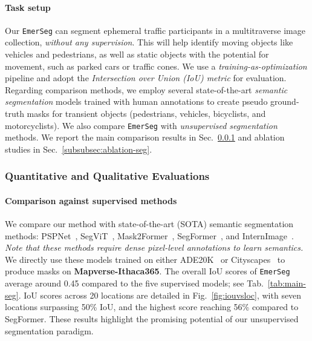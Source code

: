 \paragraph{Task setup} Our \texttt{EmerSeg} can segment ephemeral traffic participants in a multitraverse image collection, \textit{without any supervision}. This will help identify moving objects like vehicles and pedestrians, as well as static objects with the potential for movement, such as parked cars or traffic cones. We use a \textit{training-as-optimization} pipeline and adopt the \textit{Intersection over Union (IoU) metric} for evaluation. Regarding comparison methods, we employ several state-of-the-art \textit{semantic segmentation} models trained with human annotations to create pseudo ground-truth masks for transient objects  (pedestrians, vehicles, bicyclists, and motorcyclists). We also compare \texttt{EmerSeg} with \textit{unsupervised segmentation} methods. We report the main comparison results in Sec.~\ref{subsubsec:main-seg} and ablation studies in Sec.~\ref{subsubsec:ablation-seg}.
\subsubsection{Quantitative and Qualitative Evaluations}
\label{subsubsec:main-seg}
\paragraph{Comparison against supervised methods} We compare our method with state-of-the-art (SOTA) semantic segmentation methods: PSPNet~\cite{zhao2017pyramid}, SegViT~\cite{zhang2022segvit}, 
Mask2Former~\cite{cheng2022masked}, SegFormer~\cite{xie2021segformer}, and InternImage~\cite{wang2023internimage}. \textit{Note that these methods require dense pixel-level annotations to learn semantics.} We directly use these models trained on either ADE20K~\cite{zhou2017scene} or Cityscapes~\cite{cordts2016cityscapes} to produce masks on \textbf{Mapverse-Ithaca365}. The overall IoU scores of \texttt{EmerSeg} average around 0.45 compared to the five supervised models; see Tab.~\ref{tab:main-seg}. IoU scores across 20 locations are detailed in Fig.~\ref{fig:iouvsloc}, with seven locations surpassing 50\% IoU, and the highest score reaching 56\% compared to SegFormer. These results highlight the promising potential of our unsupervised segmentation paradigm.
